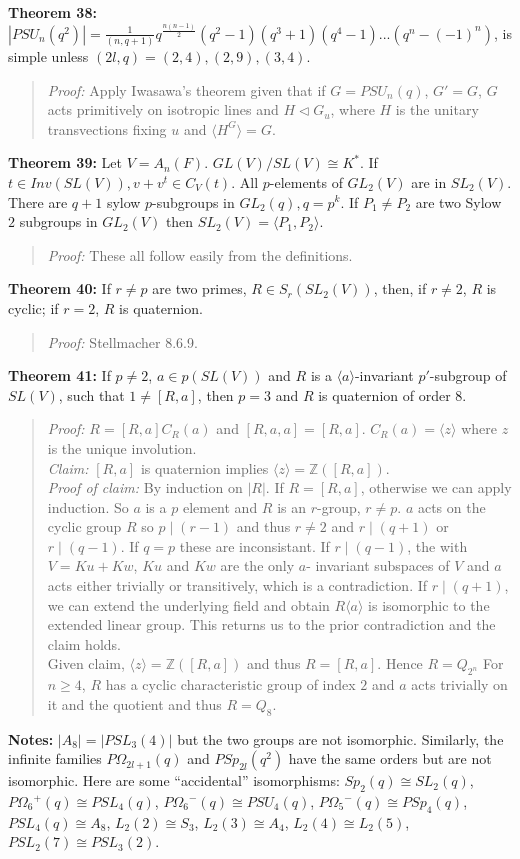 {\bf Theorem 38:}
$|PSU_n(q^2)|= {\frac 1 {(n,q+1)}} q^{\frac {n(n-1)} 2} (q^{2} -1) (q^{3} +1) 
(q^4 -1)...  (q^{n} - (-1)^n)$,
is simple unless $(2l,q)= (2,4), (2,9), (3,4)$.
\begin{quote}
\emph{Proof:}  
Apply Iwasawa's theorem given that if $G= PSU_n(q)$, $G'=G$,
$G$ acts primitively on isotropic lines and $H \lhd G_u$, where $H$ is the unitary
transvections fixing $u$ and $ \langle H^G \rangle = G$.
\end{quote}
{\bf Theorem 39:} Let $V= A_n(F)$.  $GL(V)/SL(V) \cong K^*$.  
If $t \in Inv(SL(V)), v + v^t \in C_V(t)$.
All $p$-elements of $GL_2(V)$ are in $SL_2(V)$.  There are $q+1$ sylow $p$-subgroups in
$GL_2(q), q= p^k$.  If $P_1 \ne P_2$ are two Sylow $2$ subgroups in $GL_2(V)$ then
$SL_2(V)=
\langle
P_1, P_2
\rangle
$.
\begin{quote}
\emph{Proof:}  
These all follow easily from the definitions.
\end{quote}
{\bf Theorem 40:} If $r \ne p$ are two primes, $R \in S_r(SL_2(V))$, then, if $r \ne 2$,
$R$ is cyclic; if $r=2$, $R$ is quaternion.
\begin{quote}
\emph{Proof:}  Stellmacher 8.6.9.
\end{quote}
{\bf Theorem 41:} If $p \ne 2$, $a \in p(SL(V))$ and $R$ is a $ \langle a \rangle $-invariant 
$p'$-subgroup of
$SL(V)$, such that $1 \ne [R,a]$, then $p=3$ and $R$ is quaternion of order $8$.
\begin{quote}
\emph{Proof:}  
$R= [R, a] C_R(a)$ and $[R, a, a] = [R, a]$.  $C_R(a) = \langle z \rangle$ where
$z$ is the unique involution.\\
\emph{Claim:} $[R, a]$ is quaternion implies 
$\langle z \rangle = {\mathbb Z}([R,a])$.
\\
\emph{Proof of claim:} By induction on $|R|$.  If $R = [R,a]$, otherwise we can apply
induction.  So $a$ is a $p$ element and $R$ is an $r$-group, $r \ne p$.  $a$ acts
on the cyclic group $R$ so $p \mid (r-1)$ and thus $r \ne 2$ and $r \mid (q+1)$ or $r \mid (q-1)$.
If $q=p$ these are inconsistant.  If $r \mid (q-1)$, the with $V= Ku + Kw$, $Ku$ and
$Kw$ are the only $a$- invariant subspaces of $V$ and $a$ acts either trivially or transitively,
which is a contradiction.  If $r \mid (q+1)$, we can extend the underlying field and obtain
$R \langle a \rangle$ is isomorphic to the extended linear group.  This returns us to the prior
contradiction and the claim holds.
\\
Given claim, 
$\langle z \rangle = {\mathbb Z}([R,a])$ and thus $R= [R, a]$.  Hence $R= Q_{2^n}$
For $n \ge 4$, $R$ has a cyclic characteristic
group of index $2$ and $a$ acts trivially on it and the quotient and thus $R=Q_8$.
\end{quote}
{\bf Notes:} $|A_8|=|PSL_3(4)|$ but the two groups are not isomorphic.  Similarly, the infinite
families $P \Omega_{2l+1}(q)$ and $PSp_{2l}(q^2)$ have the same orders but are not isomorphic.
Here are some ``accidental'' isomorphisms:
$Sp_2(q) \cong SL_2(q)$,
$P{\Omega_6}^+(q) \cong PSL_4(q)$,
$P{\Omega_6}^-(q) \cong PSU_4(q)$,
$P{\Omega_5}^-(q) \cong PSp_4(q)$,
$PSL_4(q) \cong A_8$,
$L_2(2) \cong S_3$,
$L_2(3) \cong A_4$,
$L_2(4) \cong L_2(5)$,
$PSL_2(7) \cong PSL_3(2)$.
